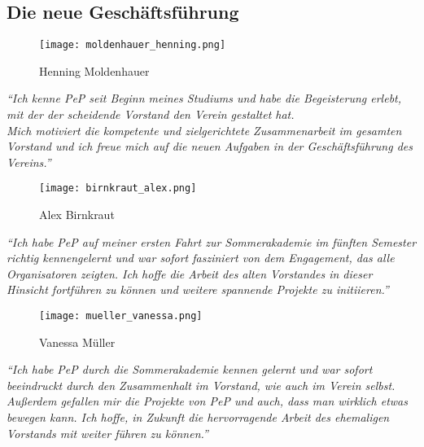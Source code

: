 \documentclass[12pt,DIV=16,parskip=full, headings=small,]{scrartcl}
\begin{document}
\begin{multicols}{2}
\section*{Die neue Geschäftsführung}

\begin{wrapfigure}{r}{.21\textwidth}
	\vspace{-20pt}
	\begin{center}
		\texttt{[image: moldenhauer\_henning.png]}
	\end{center}
	\vspace{-20pt}
	\caption*{Henning Moldenhauer}
	\vspace{-10pt}
\end{wrapfigure}

\textit{\enquote{Ich kenne PeP seit Beginn meines Studiums und habe die Begeisterung erlebt, mit der der scheidende Vorstand den Verein gestaltet hat.\\
Mich motiviert die kompetente und zielgerichtete Zusammenarbeit im gesamten Vorstand und ich freue mich auf die neuen Aufgaben in der Geschäftsführung des Vereins.}}

\begin{wrapfigure}{l}{.21\textwidth}
	\vspace{-20pt}
	\begin{center}
		\texttt{[image: birnkraut\_alex.png]}
	\end{center}
	\vspace{-20pt}
	\caption*{Alex Birnkraut}
	\vspace{-10pt}
\end{wrapfigure}

\textit{\enquote{Ich habe PeP auf meiner ersten Fahrt zur Sommerakademie im fünften Semester richtig kennengelernt und war sofort fasziniert von dem Engagement, das alle Organisatoren zeigten. Ich hoffe die Arbeit des alten Vorstandes in dieser Hinsicht fortführen zu können und weitere spannende Projekte zu initiieren.}}

\begin{wrapfigure}{r}{.21\textwidth}
	\vspace{-20pt}
	\begin{center}
		\texttt{[image: mueller\_vanessa.png]}
	\end{center}
	\vspace{-20pt}
	\caption*{Vanessa Müller}
	\vspace{-10pt}
\end{wrapfigure}

\textit{\enquote{Ich habe PeP durch die Sommerakademie kennen gelernt und war sofort beeindruckt durch den Zusammenhalt im Vorstand, wie auch im Verein selbst. Außerdem gefallen mir die Projekte von PeP und auch, dass man wirklich etwas bewegen kann. Ich hoffe, in Zukunft die hervorragende Arbeit des ehemaligen Vorstands mit weiter führen zu können.}}

\end{multicols}
\end{document}
